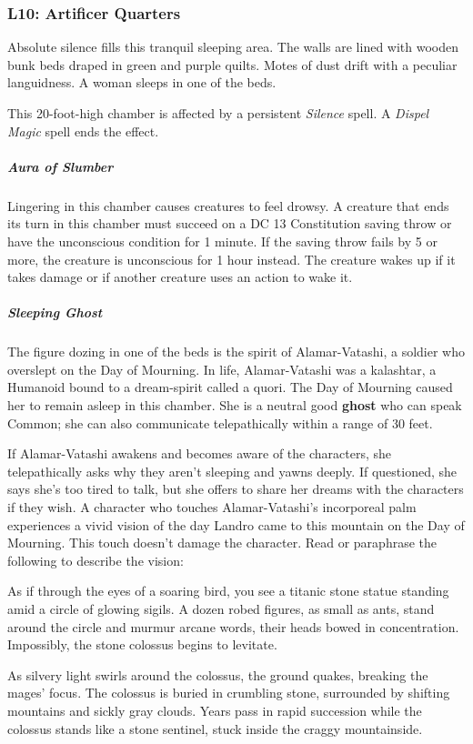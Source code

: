 \documentclass[10pt,a4paper,twoside,bg=print,twocolumn,openany,nodeprecatedcode]{dndbook}
\begin{document}
\subsubsection{L10: Artificer Quarters}
\begin{DndReadAloud}{}
Absolute silence fills this tranquil sleeping area. The walls are lined with wooden bunk beds draped in green and purple quilts. Motes of dust drift with a peculiar languidness. A woman sleeps in one of the beds.

\end{DndReadAloud}

This 20-foot-high chamber is affected by a persistent \textit{Silence} spell. A \textit{Dispel Magic} spell ends the effect.

\subparagraph{Aura of Slumber}
Lingering in this chamber causes creatures to feel drowsy. A creature that ends its turn in this chamber must succeed on a DC 13 Constitution saving throw or have the unconscious condition for 1 minute. If the saving throw fails by 5 or more, the creature is unconscious for 1 hour instead. The creature wakes up if it takes damage or if another creature uses an action to wake it.

\subparagraph{Sleeping Ghost}
The figure dozing in one of the beds is the spirit of Alamar-Vatashi, a soldier who overslept on the Day of Mourning. In life, Alamar-Vatashi was a kalashtar, a Humanoid bound to a dream-spirit called a quori. The Day of Mourning caused her to remain asleep in this chamber. She is a neutral good \textbf{ghost} who can speak Common; she can also communicate telepathically within a range of 30 feet.

If Alamar-Vatashi awakens and becomes aware of the characters, she telepathically asks why they aren't sleeping and yawns deeply. If questioned, she says she's too tired to talk, but she offers to share her dreams with the characters if they wish. A character who touches Alamar-Vatashi's incorporeal palm experiences a vivid vision of the day Landro came to this mountain on the Day of Mourning. This touch doesn't damage the character. Read or paraphrase the following to describe the vision:

\begin{DndReadAloud}{}
As if through the eyes of a soaring bird, you see a titanic stone statue standing amid a circle of glowing sigils. A dozen robed figures, as small as ants, stand around the circle and murmur arcane words, their heads bowed in concentration. Impossibly, the stone colossus begins to levitate.

As silvery light swirls around the colossus, the ground quakes, breaking the mages' focus. The colossus is buried in crumbling stone, surrounded by shifting mountains and sickly gray clouds. Years pass in rapid succession while the colossus stands like a stone sentinel, stuck inside the craggy mountainside.

\end{DndReadAloud}
\end{document}
